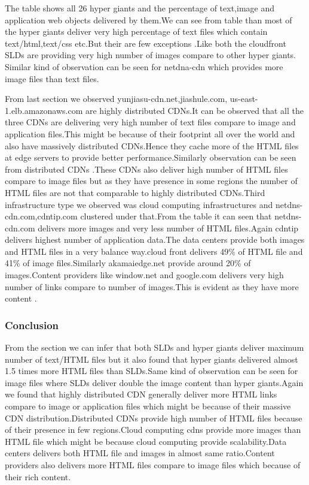 The table shows all 26 hyper giants and the percentage of text,image and application web objects delivered by them.We can see from table than most of the hyper giants deliver very high percentage of text files which contain text/html,text/css etc.But their are few exceptions .Like both the cloudfront SLDs are providing very high number of images compare to other hyper giants.  Similar kind of observation can be seen for netdna-cdn which provides more image files than text files.

From last section we observed yunjiasu-cdn.net,jiashule.com, us-east-1.elb.amazonaws.com
 are highly distributed CDNs.It can be observed that all the three CDNs are delivering very high number of text files compare to image and application files.This might be because of their footprint all over the world and also have massively distributed CDNs.Hence they cache more of the HTML  files at edge servers to provide better performance.Similarly observation can be seen from  distributed CDNs .These CDNs also deliver high number of HTML files compare to image files but as they have presence in some regions the number of HTML files are not that comparable to highly distributed CDNs.Third infrastructure type we observed was cloud computing infrastructures and netdns-cdn.com,cdntip.com clustered under that.From the table it can seen that  netdns-cdn.com delivers more images and very less number of HTML files.Again cdntip delivers highest number of application data.The data centers provide both images and HTML files in a  very balance way.cloud front delivers 49\% of HTML file and 41\% of image files.Similarly akamaiedge.net provide around 20\%  of images.Content providers like window.net and google.com delivers very high number of links compare to number of images.This is evident as they have more content . 

\subsubsection{Conclusion}
From the section we can infer that both SLDs and hyper giants deliver maximum number of text/HTML files but it also found that hyper giants delivered almost 1.5 times more HTML files than SLDs.Same kind of observation can be seen for image files where SLDs deliver double the image content than hyper giants.Again we found that highly distributed CDN generally deliver more HTML links compare to image or application files which might be because of their massive CDN distribution.Distributed CDNs provide high number of HTML files because of their  presence in few regions.Cloud computing cdns provide more images than HTML file which might be because cloud computing provide scalability.Data centers delivers both HTML file and images in almost same ratio.Content providers also delivers more HTML files compare to image files which because of their rich content.
